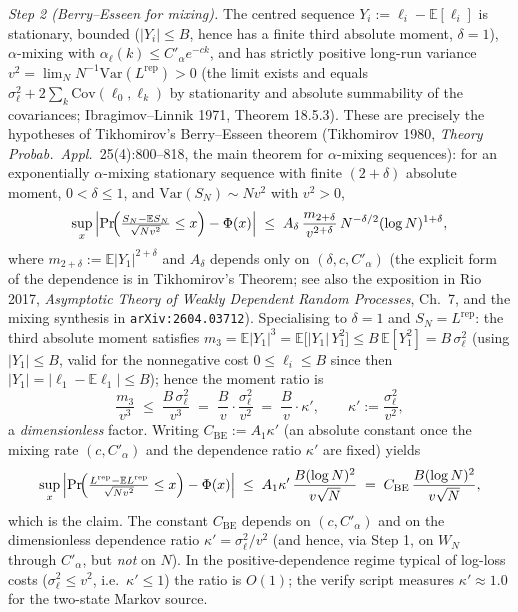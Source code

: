 \documentclass[
]{article}
\begin{document}
\emph{Step 2 (Berry--Esseen for mixing).} The centred sequence
$Y_i := \ell_i - \mathbb{E}[\ell_i]$ is stationary, bounded
($|Y_i| \leq B$, hence has a finite third absolute moment,
$\delta = 1$), $\alpha$-mixing with $\alpha_\ell(k) \leq C'_\alpha
e^{-ck}$, and has strictly positive long-run variance $v^2 =
\lim_{N} N^{-1}\mathrm{Var}(L^{\mathrm{rep}}) > 0$ (the limit exists
and equals $\sigma_\ell^2 + 2\sum_{k} \mathrm{Cov}(\ell_0,\ell_k)$ by
stationarity and absolute summability of the covariances;
Ibragimov--Linnik 1971, Theorem 18.5.3). These are precisely the
hypotheses of Tikhomirov's Berry--Esseen theorem (Tikhomirov 1980,
\emph{Theory Probab.\ Appl.}\ 25(4):800--818, the main theorem for
$\alpha$-mixing sequences): for an exponentially $\alpha$-mixing
stationary sequence with finite $(2+\delta)$ absolute moment,
$0 < \delta \leq 1$, and $\mathrm{Var}(S_N) \sim N v^2$ with $v^2 > 0$,
\[
  \sup_x \left| \Pr\!\Bigl( \tfrac{S_N - \mathbb{E} S_N}{\sqrt{N v^2}}
  \leq x \Bigr) - \Phi(x) \right|
  \;\leq\; A_{\delta}\, \frac{m_{2+\delta}}{v^{2+\delta}}\,
  N^{-\delta/2} (\log N)^{1+\delta} ,
\]
where $m_{2+\delta} := \mathbb{E}|Y_1|^{2+\delta}$ and $A_\delta$
depends only on $(\delta, c, C'_\alpha)$ (the explicit form of the
dependence is in Tikhomirov's Theorem; see also the exposition in Rio
2017, \emph{Asymptotic Theory of Weakly Dependent Random Processes},
Ch.~7, and the mixing synthesis in \texttt{arXiv:2604.03712}).
Specialising to $\delta = 1$ and $S_N = L^{\mathrm{rep}}$: the third
absolute moment satisfies $m_3 = \mathbb{E}|Y_1|^3 = \mathbb{E}\bigl[
|Y_1|\, Y_1^2 \bigr] \leq B\, \mathbb{E}[Y_1^2] = B\, \sigma_\ell^2$
(using $|Y_1| \le B$, valid for the nonnegative cost
$0 \le \ell_i \le B$ since then $|Y_1| = |\ell_1 - \mathbb{E}\ell_1|
\le B$); hence the moment ratio is
\[
  \frac{m_3}{v^3} \;\leq\; \frac{B\, \sigma_\ell^2}{v^3}
  \;=\; \frac{B}{v}\cdot \frac{\sigma_\ell^2}{v^2}
  \;=\; \frac{B}{v}\cdot \kappa' , \qquad
  \kappa' := \frac{\sigma_\ell^2}{v^2} ,
\]
a \emph{dimensionless} factor. Writing $C_{\mathrm{BE}} := A_1 \kappa'$
(an absolute constant once the mixing rate $(c, C'_\alpha)$ and the
dependence ratio $\kappa'$ are fixed) yields
\[
  \sup_x \left| \Pr\!\Bigl( \tfrac{L^{\mathrm{rep}} - \mathbb{E}
  L^{\mathrm{rep}}}{\sqrt{N v^2}} \leq x \Bigr) - \Phi(x) \right|
  \;\leq\; A_1 \kappa'\, \frac{B (\log N)^2}{v \sqrt{N}}
  \;=\; C_{\mathrm{BE}}\, \frac{B (\log N)^2}{v \sqrt{N}} ,
\]
which is the claim. The constant $C_{\mathrm{BE}}$ depends on
$(c, C'_\alpha)$ and on the dimensionless dependence ratio
$\kappa' = \sigma_\ell^2/v^2$ (and hence, via Step 1, on $W_N$ through
$C'_\alpha$, but \emph{not} on $N$). In the positive-dependence regime
typical of log-loss costs ($\sigma_\ell^2 \leq v^2$, i.e.\
$\kappa' \leq 1$) the ratio is $O(1)$; the verify script measures
$\kappa' \approx 1.0$ for the two-state Markov source.
\end{document}
